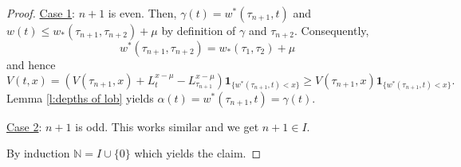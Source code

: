 \documentclass[11pt]{scrartcl}
\begin{document}
\begin{proof}
\underline{Case 1}: $n+1$ is even. Then, $\gamma(t) = w^*(\tau_{n+1},t)$ and 
 $w(t) \leq w_*(\tau_{n+1},\tau_{n+2})+\mu$ by definition of $\gamma$ and $\tau_{n+2}$. Consequently,
  $$ w^*(\tau_{n+1},\tau_{n+2}) = w_*(\tau_1,\tau_2)+\mu $$
 and hence
  $$ V(t,x) = \left(V(\tau_{n+1},x)+L_t^{x-\mu}-L_{\tau_{n+1}}^{x-\mu}\right)\mathbf{1}_{\{w^*(\tau_{n+1},t)<x\}}\geq V(\tau_{n+1},x)\mathbf{1}_{\{w^*(\tau_{n+1},t)<x\}}.  $$
 Lemma \ref{l:depths of lob} yields $\alpha(t) = w^*(\tau_{n+1},t) = \gamma(t)$.
 
\underline{Case 2}: $n+1$ is odd. This works similar and we get $n+1\in I$.

By induction $\mathbb N= I\cup\{0\}$ which yields the claim.
%
%
%
%
%  

\end{proof}
\end{document}
